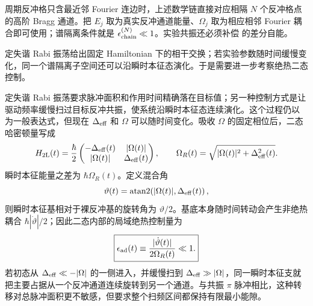 \begin{exbox}[$N$ 阶 Bragg 跃迁]
周期反冲格只含最近邻 Fourier 连边时，上述数学链直接对应相隔 $N$ 个反冲格点的高阶 Bragg 通道。把 $E_j$ 取为真实反冲通道能量、$\Omega_j$ 取为相应相邻 Fourier 耦合即可使用；谱隔离条件就是 $\epsilon_{\rm chain}^{(N)}\ll1$。实验共振还必须补偿 的差分自能。
\end{exbox}



定失谐 Rabi 振荡给出固定 Hamiltonian 下的相干交换；若实验参数随时间缓慢变化，同一个谱隔离子空间还可以沿瞬时本征态演化。于是需要进一步考察绝热二态控制。

定失谐 Rabi 振荡要求脉冲面积和作用时间精确落在目标值；另一种控制方式是让驱动频率缓慢扫过目标反冲共振，使系统沿瞬时本征态连续演化。这个过程仍以 为一般表达式，但现在 $\Delta_{\rm eff}$ 和 $\Omega$ 可以随时间变化。吸收 $\Omega$ 的固定相位后，二态哈密顿量写成
\begin{equation}
 H_{2\rm L}(t)
 =\frac{\hbar}{2}
 \begin{pmatrix}
 -\Delta_{\rm eff}(t)&|\Omega(t)|\\
 |\Omega(t)|&\Delta_{\rm eff}(t)
 \end{pmatrix},
 \qquad
 \Omega_R(t)=\sqrt{|\Omega(t)|^2+\Delta_{\rm eff}^2(t)}.
 \label{eq:recoil-adiabatic-twolevel-dp32}
\end{equation}
瞬时本征能量之差为 $\hbar\Omega_R(t)$。定义混合角
\begin{equation*}
 \vartheta(t)=\operatorname{atan2}\!\left(|\Omega(t)|,\Delta_{\rm eff}(t)\right),
\end{equation*}
则瞬时本征基相对于裸反冲基的旋转角为 $\vartheta/2$。基底本身随时间转动会产生非绝热耦合 $\hbar|\dot\vartheta|/2$；因此二态内部的局域绝热控制量为
\begin{equation}
 \boxed{
 \epsilon_{\rm ad}(t)
 \equiv\frac{|\dot\vartheta(t)|}{2\Omega_R(t)}\ll1.}
 \label{eq:recoil-adiabatic-criterion-dp32}
\end{equation}
若初态从 $\Delta_{\rm eff}\ll-|\Omega|$ 的一侧进入，并缓慢扫到 $\Delta_{\rm eff}\gg|\Omega|$，同一瞬时本征支就把主要占据从一个反冲通道连续旋转到另一个通道。与共振 $\pi$ 脉冲相比，这种转移对总脉冲面积更不敏感，但要求整个扫频区间都保持有限最小能隙。

